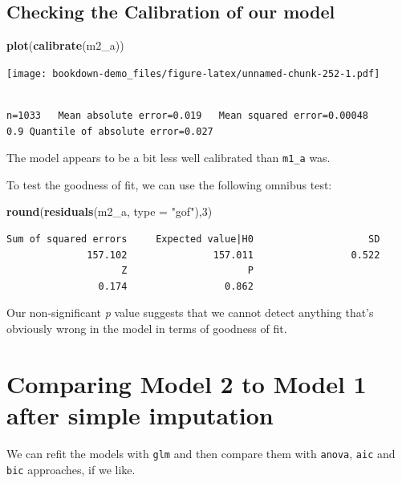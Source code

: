 \documentclass[]{book}
\newenvironment{Shaded}{\begin{snugshade}}{\end{snugshade}}
\newcommand{\KeywordTok}[1]{\textcolor[rgb]{0.13,0.29,0.53}{\textbf{#1}}}
\newcommand{\DataTypeTok}[1]{\textcolor[rgb]{0.13,0.29,0.53}{#1}}
\newcommand{\DecValTok}[1]{\textcolor[rgb]{0.00,0.00,0.81}{#1}}
\newcommand{\StringTok}[1]{\textcolor[rgb]{0.31,0.60,0.02}{#1}}
\newcommand{\NormalTok}[1]{#1}
\theoremstyle{definition}
\theoremstyle{definition}
\theoremstyle{definition}
\theoremstyle{remark}
\begin{document}
\subsection{Checking the Calibration of our
model}\label{checking-the-calibration-of-our-model-1}

\begin{Shaded}
\begin{Highlighting}[]
\KeywordTok{plot}\NormalTok{(}\KeywordTok{calibrate}\NormalTok{(m2_a))}
\end{Highlighting}
\end{Shaded}

\texttt{[image: bookdown-demo\_files/figure-latex/unnamed-chunk-252-1.pdf]}

\begin{verbatim}

n=1033   Mean absolute error=0.019   Mean squared error=0.00048
0.9 Quantile of absolute error=0.027
\end{verbatim}

The model appears to be a bit less well calibrated than \texttt{m1\_a}
was.

To test the goodness of fit, we can use the following omnibus test:

\begin{Shaded}
\begin{Highlighting}[]
\KeywordTok{round}\NormalTok{(}\KeywordTok{residuals}\NormalTok{(m2_a, }\DataTypeTok{type =} \StringTok{"gof"}\NormalTok{),}\DecValTok{3}\NormalTok{)}
\end{Highlighting}
\end{Shaded}

\begin{verbatim}
Sum of squared errors     Expected value|H0                    SD 
              157.102               157.011                 0.522 
                    Z                     P 
                0.174                 0.862 
\end{verbatim}

Our non-significant \emph{p} value suggests that we cannot detect
anything that's obviously wrong in the model in terms of goodness of
fit.

\section{Comparing Model 2 to Model 1 after simple
imputation}\label{comparing-model-2-to-model-1-after-simple-imputation}

We can refit the models with \texttt{glm} and then compare them with
\texttt{anova}, \texttt{aic} and \texttt{bic} approaches, if we like.
\end{document}
